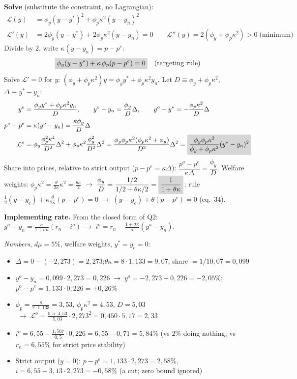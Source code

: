 \documentclass[11pt, a4paper]{article}
\newcommand{\res}[1]{\colorbox{hl}{$\displaystyle #1$}}
\newcommand{\ra}{\;\rightarrow\;}
\begin{document}
\textbf{Solve} (substitute the constraint, no Lagrangian):
\begin{align*}
\mathcal L(y)&=\phi_y(y-y^*)^2+\phi_p\kappa^2(y-y_n)^2\\
\mathcal L'(y)&=2\phi_y(y-y^*)+2\phi_p\kappa^2(y-y_n)=0
  \qquad\mathcal L''(y)=2(\phi_y+\phi_p\kappa^2)>0\;\text{(minimum)}
\end{align*}
Divide by 2, write $\kappa(y-y_n)=p-p^e$:
\[
\res{\phi_y(y-y^*)+\kappa\,\phi_p(p-p^e)=0}\quad\text{(targeting rule)}
\]
Solve $\mathcal L'=0$ for $y$: $(\phi_y+\phi_p\kappa^2)y=\phi_y y^*+\phi_p\kappa^2y_n$. Let $D\equiv\phi_y+\phi_p\kappa^2$, $\Delta\equiv y^*-y_n$:
\begin{align*}
y^o&=\frac{\phi_y y^*+\phi_p\kappa^2y_n}{D},\qquad
y^o-y_n=\frac{\phi_y}{D}\Delta,\qquad y^o-y^*=-\frac{\phi_p\kappa^2}{D}\Delta\\
p^o-p^e&=\kappa(y^o-y_n)=\frac{\kappa\phi_y}{D}\Delta\\
\mathcal L^o&=\phi_y\frac{\phi_p^2\kappa^4}{D^2}\Delta^2+\phi_p\kappa^2\frac{\phi_y^2}{D^2}\Delta^2
=\frac{\phi_y\phi_p\kappa^2(\phi_p\kappa^2+\phi_y)}{D^2}\Delta^2
=\res{\frac{\phi_y\phi_p\kappa^2}{\phi_y+\phi_p\kappa^2}(y^*-y_n)^2}
\end{align*}
Share into prices, relative to strict output ($p-p^e=\kappa\Delta$):
$\dfrac{p^o-p^e}{\kappa\Delta}=\dfrac{\phi_y}{D}$.
Welfare weights: $\phi_p\kappa^2=\tfrac{\theta}{2\kappa}\kappa^2=\tfrac{\theta\kappa}{2}$
$\ra\dfrac{\phi_y}{D}=\dfrac{1/2}{1/2+\theta\kappa/2}=\res{\dfrac{1}{1+\theta\kappa}}$; rule
$\tfrac12(y-y_e)+\kappa\tfrac{\theta}{2\kappa}(p-p^e)=0\ra(y-y_e)+\theta(p-p^e)=0$ (eq.~34).

\textbf{Implementing rate.} From the closed form of Q2:
$y^o-y_n=\tfrac{\sigma}{1+\sigma\kappa}(r_n-i^o)\ra i^o=r_n-\tfrac{1+\sigma\kappa}{\sigma}(y^o-y_n)$.

\emph{Numbers}, $d\mu=5\%$, welfare weights, $y^*=y_e=0$:
\begin{itemize}
\item $\Delta=0-(-2{,}273)=2{,}273$;\quad $\theta\kappa=8\cdot1{,}133=9{,}07$;\quad
      share $=1/10{,}07=0{,}099$
\item $y^o-y_n=0{,}099\cdot2{,}273=0{,}226\ra y^o=-2{,}273+0{,}226=-2{,}05\%$;\quad
      $p^o-p^e=1{,}133\cdot0{,}226=+0{,}26\%$
\item $\phi_p=\tfrac{8}{2\cdot1{,}133}=3{,}53$, $\phi_p\kappa^2=4{,}53$, $D=5{,}03$
      $\ra\mathcal L^o=\tfrac{0{,}5\cdot4{,}53}{5{,}03}\cdot2{,}273^2=0{,}450\cdot5{,}17=2{,}33$
\item $i^o=6{,}55-\tfrac{1{,}567}{0{,}5}\cdot0{,}226=6{,}55-0{,}71=5{,}84\%$
      (vs $2\%$ doing nothing; vs $r_n=6{,}55\%$ for strict price stability)
\item Strict output ($y=0$): $p-p^e=1{,}133\cdot2{,}273=2{,}58\%$,
      $i=6{,}55-3{,}13\cdot2{,}273=-0{,}58\%$ (a cut; zero bound ignored)
\end{itemize}
\end{document}
